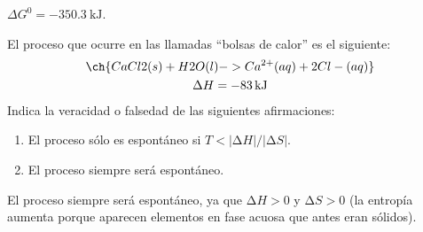   \begin{solution}
    \( \Delta G^0 = \SI{-350.3}{\kilo\joule} \).
  \end{solution}




  \begin{exercise}[
      tags    = {termodinámica, espontaneidad, Gibbs},
      topics  = {química, termoquímica, termodinámica},
      source  = {FQ 1B OXF 2015, p145, e34},
    ]
    El proceso que ocurre en las llamadas “bolsas de calor” es el siguiente:
    \begin{multline*}
      \ch{CaCl2(s) + H2O(l) -> Ca^{2+}(aq) + 2 Cl-(aq)} \\
      \Delta H = \SI{-83}{\kilo\joule}
    \end{multline*}
    Indica la veracidad o falsedad de las siguientes afirmaciones:
    \begin{enumerate}
      \item El proceso sólo es espontáneo si \( T < |∆H|/|∆S| \).
      \item El proceso siempre será espontáneo.
    \end{enumerate}

  \end{exercise}

  \begin{solution}
    El proceso siempre será espontáneo, ya que \( ∆H > 0 \) y \( ∆S > 0 \) (la entropía aumenta porque aparecen elementos en fase acuosa que antes eran sólidos).
  \end{solution}




